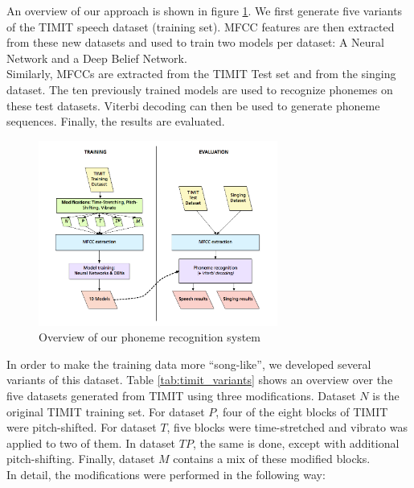 An overview of our approach is shown in figure \ref{fig:overview}. We first generate five variants of the TIMIT speech dataset (training set). MFCC features are then extracted from these new datasets and used to train two models per dataset: A Neural Network and a Deep Belief Network.\\
Similarly, MFCCs are extracted from the TIMIT Test set and from the singing dataset. The ten previously trained models are used to recognize phonemes on these test datasets. Viterbi decoding can then be used to generate phoneme sequences. Finally, the results are evaluated.
\setlength{\belowcaptionskip}{-0.4cm}
\begin{figure}
 \begin{center}
                \includegraphics[width=0.7\textwidth]{images/process_songify.png}
                \caption{Overview of our phoneme recognition system}
                \label{fig:overview}
                 \end{center}
 \end{figure}
 \setlength{\belowcaptionskip}{-0.1cm}
In order to make the training data more ``song-like'', we developed several variants of this dataset. Table \ref{tab:timit_variants} shows an overview over the five datasets generated from TIMIT using three modifications. Dataset $N$ is the original TIMIT training set. For dataset $P$, four of the eight blocks of TIMIT were pitch-shifted. For dataset $T$, five blocks were time-stretched and vibrato was applied to two of them. In dataset $TP$, the same is done, except with additional pitch-shifting. Finally, dataset $M$ contains a mix of these modified blocks.\\
In detail, the modifications were performed in the following way:

